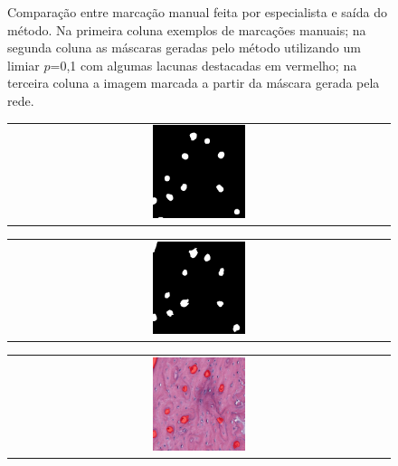 \begin{figure}[H]
    \caption[Comparação entre marcação manual feita por especialista e saída do método.]{Comparação entre marcação manual feita por especialista e saída do método. Na primeira coluna exemplos de marcações manuais; na segunda coluna as máscaras geradas pelo método utilizando um limiar $p$=0,1 com algumas lacunas destacadas em vermelho; na terceira coluna a imagem marcada a partir da máscara gerada pela rede.}
    \label{fig:marcacoes-final-canal}
\end{figure}

\begin{figure}[H]
    \center
    \begin{tabular}{@{}c@{}}
        \includegraphics[width=0.25\textwidth]{figures/4_results/204_r3c2_mask_manual_10.png}
        \\[\abovecaptionskip]
    \end{tabular}
    \begin{tabular}{@{}c@{}}
        \includegraphics[width=0.25\textwidth]{figures/4_results/204_r3c2_mask_net_10.png}
        \\[\abovecaptionskip]
    \end{tabular}
    \begin{tabular}{@{}c@{}}
        \includegraphics[width=0.25\textwidth]{figures/4_results/204_r3c2_net_out_10.png}
        \\[\abovecaptionskip]
    \end{tabular}


\end{figure}
